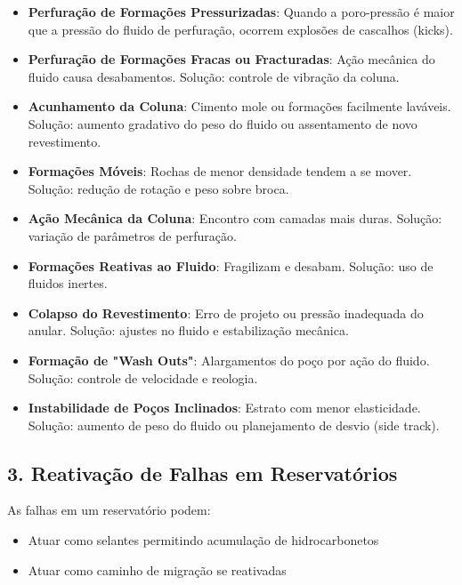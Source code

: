 \documentclass[12pt,a4paper,twoside]{book}
\begin{document}
\begin{itemize}
    \item \textbf{Perfuração de Formações Pressurizadas}: Quando a poro-pressão é maior que a pressão 
    do fluido de perfuração, ocorrem explosões de cascalhos (kicks).
    
    \item \textbf{Perfuração de Formações Fracas ou Fracturadas}: Ação mecânica do fluido causa 
    desabamentos. Solução: controle de vibração da coluna.
    
    \item \textbf{Acunhamento da Coluna}: Cimento mole ou formações facilmente laváveis. Solução: aumento 
    gradativo do peso do fluido ou assentamento de novo revestimento.
    
    \item \textbf{Formações Móveis}: Rochas de menor densidade tendem a se mover. Solução: redução de 
    rotação e peso sobre broca.
    
    \item \textbf{Ação Mecânica da Coluna}: Encontro com camadas mais duras. Solução: variação de 
    parâmetros de perfuração.
    
    \item \textbf{Formações Reativas ao Fluido}: Fragilizam e desabam. Solução: uso de fluidos inertes.
    
    \item \textbf{Colapso do Revestimento}: Erro de projeto ou pressão inadequada do anular. Solução: 
    ajustes no fluido e estabilização mecânica.
    
    \item \textbf{Formação de "Wash Outs"}: Alargamentos do poço por ação do fluido. Solução: controle 
    de velocidade e reologia.
    
    \item \textbf{Instabilidade de Poços Inclinados}: Estrato com menor elasticidade. Solução: aumento 
    de peso do fluido ou planejamento de desvio (side track).
\end{itemize}

\subsection{3. Reativação de Falhas em Reservatórios}

As falhas em um reservatório podem:
\begin{itemize}
    \item Atuar como selantes permitindo acumulação de hidrocarbonetos
    \item Atuar como caminho de migração se reativadas
\end{itemize}
\end{document}
